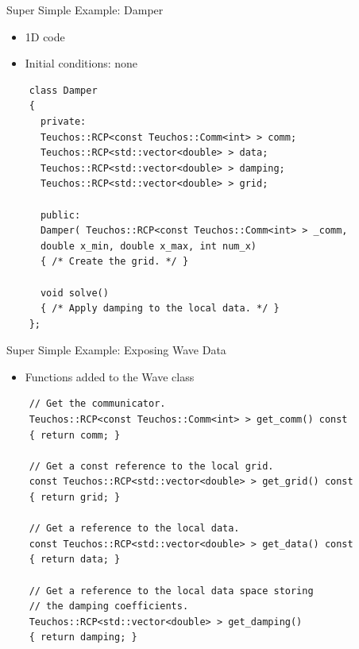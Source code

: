 \documentclass{beamer}
\begin{document}
\begin{frame}[fragile]{Super Simple Example: Damper}

  \begin{itemize}
  \item 1D code
  \item Initial conditions: none
  \end{itemize}

  \begin{lstlisting}
    class Damper
    {
      private:
      Teuchos::RCP<const Teuchos::Comm<int> > comm;
      Teuchos::RCP<std::vector<double> > data;
      Teuchos::RCP<std::vector<double> > damping;
      Teuchos::RCP<std::vector<double> > grid;

      public:
      Damper( Teuchos::RCP<const Teuchos::Comm<int> > _comm,
      double x_min, double x_max, int num_x)
      { /* Create the grid. */ }

      void solve()
      { /* Apply damping to the local data. */ }
    };
  \end{lstlisting}

\end{frame}

\begin{frame}[fragile]{Super Simple Example: Exposing Wave Data}

  \begin{itemize}
  \item Functions added to the Wave class
  \end{itemize}

  \begin{lstlisting}
    // Get the communicator.
    Teuchos::RCP<const Teuchos::Comm<int> > get_comm() const
    { return comm; }

    // Get a const reference to the local grid.
    const Teuchos::RCP<std::vector<double> > get_grid() const
    { return grid; }

    // Get a reference to the local data.
    const Teuchos::RCP<std::vector<double> > get_data() const
    { return data; }

    // Get a reference to the local data space storing 
    // the damping coefficients.
    Teuchos::RCP<std::vector<double> > get_damping()
    { return damping; }
  \end{lstlisting}

\end{frame}
\end{document}
